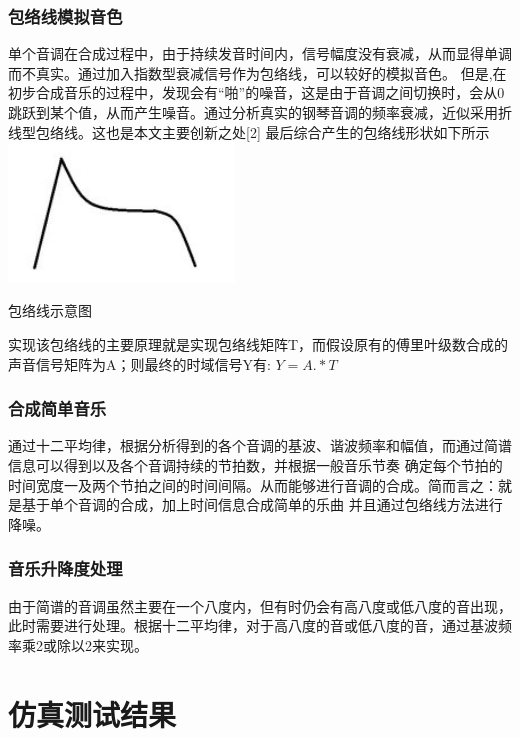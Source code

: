 \documentclass[a4paper,11pt,onecolumn,twoside]{article}
\makeatletter
\newenvironment{figurehere}
  {\def\@captype{figure}}
  {}
\makeatother
\begin{document}
\begin{CJK*}{UTF8}{gbsn}
\begin{multicols}{2}
\subsubsection{包络线模拟音色}
单个音调在合成过程中，由于持续发音时间内，信号幅度没有衰减，从而显得单调而不真实。通过加入指数型衰减信号作为包络线，可以较好的模拟音色。
但是,在初步合成音乐的过程中，发现会有“啪”的噪音，这是由于音调之间切换时，会从0跳跃到某个值，从而产生噪音。通过分析真实的钢琴音调的频率衰减，近似采用折线型包络线。这也是本文主要创新之处[2]
最后综合产生的包络线形状如下所示
\begin{figurehere}
\centering
\includegraphics[width=6cm]{../source/theory.jpg}\caption{包络线示意图}\label{fold}
\end{figurehere}
实现该包络线的主要原理就是实现包络线矩阵T，而假设原有的傅里叶级数合成的声音信号矩阵为A；则最终的时域信号Y有:
$Y=A.*T$\\
\subsubsection{合成简单音乐}
通过十二平均律，根据分析得到的各个音调的基波、谐波频率和幅值，而通过简谱信息可以得到以及各个音调持续的节拍数，并根据一般音乐节奏
确定每个节拍的时间宽度一及两个节拍之间的时间间隔。从而能够进行音调的合成。简而言之：就是基于单个音调的合成，加上时间信息合成简单的乐曲
并且通过包络线方法进行降噪。\\
\subsubsection{音乐升降度处理}
由于简谱的音调虽然主要在一个八度内，但有时仍会有高八度或低八度的音出现，此时需要进行处理。根据十二平均律，对于高八度的音或低八度的音，通过基波频率乘2或除以2来实现。\\

\section{仿真测试结果}

\end{multicols}
\end{CJK*}
\end{document}

